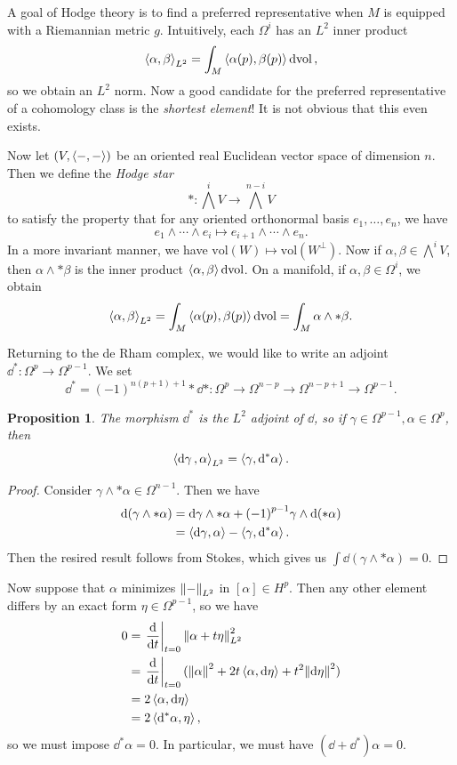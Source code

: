 \documentclass[leqno, openany]{memoir}
\newtheorem{prop}[thm]{Proposition}
\theoremstyle{definition}
\theoremstyle{remark}
\theoremstyle{plain}
\theoremstyle{definition}
\theoremstyle{remark}
\newcommand{\mr}[1]{\mathrm{#1}}
\begin{document}
A goal of Hodge theory is to find a preferred representative when $M$ is equipped with a Riemannian metric $g$. Intuitively, each $\Omega^i$ has an $L^2$ inner product
\[ \ev{\alpha, \beta}_{L^2} = \int_M \ev{\alpha(p), \beta(p)} \dd{\mr{vol}}, \]
so we obtain an $L^2$ norm. Now a good candidate for the preferred representative of a cohomology class is the \textit{shortest element}! It is not obvious that this even exists. 

Now let $(V, \ev{-,-})$ be an oriented real Euclidean vector space of dimension $n$. Then we define the \textit{Hodge star}
\[ * \colon {\bigwedge}^i V \to {\bigwedge}^{n-i} V \]
to satisfy the property that for any oriented orthonormal basis $e_1, \ldots, e_n$, we have
\[ e_1 \wedge \cdots \wedge e_i \mapsto e_{i+1} \wedge \cdots \wedge e_n. \]
In a more invariant manner, we have $\mr{vol}(W) \mapsto \mr{vol}(W^{\perp})$. Now if $\alpha, \beta \in \bigwedge^i V$, then $\alpha \wedge *\beta$ is the inner product $\ev{\alpha,\beta} \dd{\mr{vol}}$. On a manifold, if $\alpha, \beta \in \Omega^i$, we obtain
\[ \ev{\alpha, \beta}_{L^2} = \int_M \ev{\alpha(p), \beta(p)} \dd{\mr{vol}} = \int_M \alpha \wedge *\beta. \]

Returning to the de Rham complex, we would like to write an adjoint $\dd^* \colon \Omega^p \to \Omega^{p-1}$. We set 
\[ \dd^* = {(-1)}^{n(p+1)+1} * \dd * \colon \Omega^p \to \Omega^{n-p} \to \Omega^{n-p+1} \to \Omega^{p-1}. \]

\begin{prop}
    The morphism $\dd^*$ is the $L^2$ adjoint of $\dd$, so if $\gamma \in \Omega^{p-1}, \alpha \in \Omega^p$, then
    \[ \ev{\dd{\gamma}, \alpha}_{L^2} = \ev{\gamma, \dd^* \alpha}. \]
\end{prop}

\begin{proof}
    Consider $\gamma \wedge * \alpha \in \Omega^{n-1}$. Then we have
    \begin{align*}
        \dd{(\gamma \wedge * \alpha)} &= \dd{\gamma} \wedge * \alpha + {(-1)}^{p-1} \gamma \wedge \dd{(* \alpha)} \\
                                      &= \ev{\dd \gamma, \alpha} - \ev{\gamma, \dd^* \alpha}.
    \end{align*}
    Then the resired result follows from Stokes, which gives us $\int \dd{(\gamma \wedge * \alpha)} = 0$.
\end{proof}

Now suppose that $\alpha$ minimizes $\norm{-}_{L^2}$ in $[\alpha] \in H^p$. Then any other element differs by an exact form $\eta \in \Omega^{p-1}$, so we have
\begin{align*}
    0 &= \eval{\dv{t}}_{t=0} \norm{\alpha + t \eta}_{L^2}^2 \\
      &= \eval{ \dv{t} }_{t=0} (\norm{\alpha}^2 + 2 t \ev{\alpha, \dd{\eta}} + t^2 \norm{\dd{\eta}}^2) \\
      &= 2 \ev{\alpha, \dd{\eta}} \\
      &= 2 \ev{\dd^* \alpha, \eta},
\end{align*}
so we must impose $\dd^* \alpha = 0$. In particular, we must have $(\dd + \dd^*) \alpha = 0$.
\end{document}
